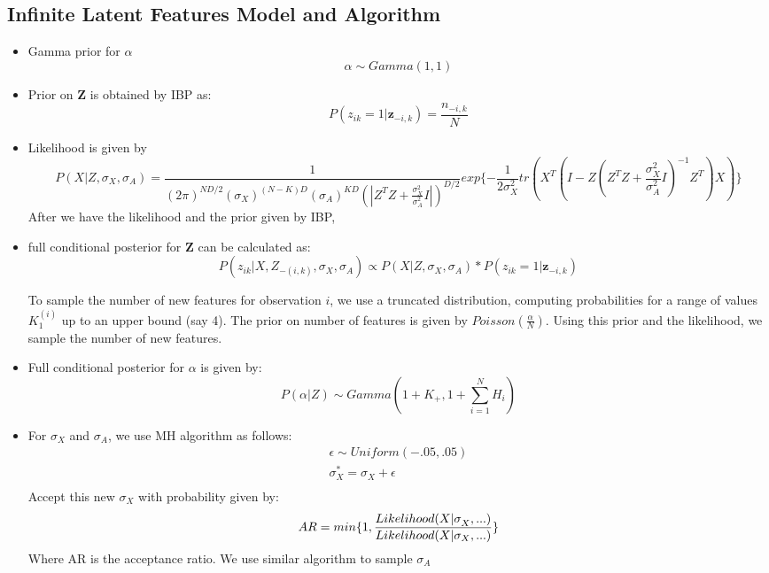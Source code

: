 \documentclass{article}
\begin{document}
\subsection{Infinite Latent Features Model and Algorithm}
\begin{itemize}
\item{Gamma prior for $\alpha$
$$
\alpha \sim Gamma(1,1)
$$}
\item{Prior on \textbf{Z} is obtained by IBP as:
$$
P(z_{ik}=1|\textbf{z}_{-i,k}) = \frac{n_{-i,k}}{N}
$$}

\item{Likelihood is given by
\begin{equation}
P(X|Z,\sigma_X, \sigma_A) = \frac{1}{(2 \pi)^{ND/2} (\sigma_X)^{(N-K)D}(\sigma_A)^{KD}(|Z^TZ+\frac{\sigma_X^2}{\sigma_A^2}I|)^{D/2}}exp\{-\frac{1}{2\sigma_X^2}tr(X^T(I-Z(Z^TZ+\frac{\sigma_X^2}{\sigma_A^2}I)^{-1}Z^T)X)\}
\end{equation}
}
After we have the likelihood and the prior given by IBP,
\item{full conditional posterior for \textbf{Z} can be calculated as:
$$
P(z_{ik}|X,Z_{-(i,k)},\sigma_X,\sigma_A) \propto  P(X|Z,\sigma_X, \sigma_A) * P(z_{ik}=1|\textbf{z}_{-i,k})
$$
}

To sample the number of new features for observation $i$, we use a truncated distribution, computing probabilities for a range of values $K_1^{(i)}$ up to an upper bound (say 4). The prior on number of features is given by $Poisson(\frac{\alpha}{N})$.
Using this prior and the likelihood, we sample the number of new features.

\item{Full conditional posterior for $\alpha$ is given by:
$$
P(\alpha|Z) \sim Gamma(1+K_+,1+\sum_{i=1}^{N} H_i)
$$}

\item{For $\sigma_X$ and $\sigma_A$, we use MH algorithm as follows:
\begin{eqnarray}
\epsilon \sim Uniform(-.05,.05)\\
\sigma_X^{*} =  \sigma_X +\epsilon\\
\end{eqnarray}
Accept this new $\sigma_X$ with probability given by:
$$
AR = min\{1,\frac{Likelihood(X|\sigma_X^{\*},...)}{Likelihood(X|\sigma_X,...)}\}\\
$$
Where AR is the acceptance ratio. We use similar algorithm to sample $\sigma_A$}

\end{itemize}
\end{document}
